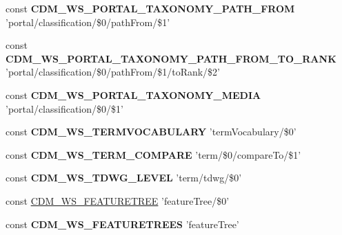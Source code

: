 \begin{DoxyCompactItemize}
\item 
\hypertarget{webservice__uris_8php_ab6da2426086817166528c03c7dc3fca9}{const {\bfseries C\-D\-M\-\_\-\-W\-S\-\_\-\-P\-O\-R\-T\-A\-L\-\_\-\-T\-A\-X\-O\-N\-O\-M\-Y\-\_\-\-P\-A\-T\-H\-\_\-\-F\-R\-O\-M} 'portal/classification/\$0/path\-From/\$1'}\label{webservice__uris_8php_ab6da2426086817166528c03c7dc3fca9}

\item 
\hypertarget{webservice__uris_8php_af16b56b68a9acae8e28b242070c035e2}{const {\bfseries C\-D\-M\-\_\-\-W\-S\-\_\-\-P\-O\-R\-T\-A\-L\-\_\-\-T\-A\-X\-O\-N\-O\-M\-Y\-\_\-\-P\-A\-T\-H\-\_\-\-F\-R\-O\-M\-\_\-\-T\-O\-\_\-\-R\-A\-N\-K} 'portal/classification/\$0/path\-From/\$1/to\-Rank/\$2'}\label{webservice__uris_8php_af16b56b68a9acae8e28b242070c035e2}

\item 
\hypertarget{webservice__uris_8php_aa2fa0dc46cbff87ad9052e1d9c3a3157}{const {\bfseries C\-D\-M\-\_\-\-W\-S\-\_\-\-P\-O\-R\-T\-A\-L\-\_\-\-T\-A\-X\-O\-N\-O\-M\-Y\-\_\-\-M\-E\-D\-I\-A} 'portal/classification/\$0/\$1'}\label{webservice__uris_8php_aa2fa0dc46cbff87ad9052e1d9c3a3157}

\item 
\hypertarget{webservice__uris_8php_a86e5dca53d3b090539b2ed9db2950ddf}{const {\bfseries C\-D\-M\-\_\-\-W\-S\-\_\-\-T\-E\-R\-M\-V\-O\-C\-A\-B\-U\-L\-A\-R\-Y} 'term\-Vocabulary/\$0'}\label{webservice__uris_8php_a86e5dca53d3b090539b2ed9db2950ddf}

\item 
\hypertarget{webservice__uris_8php_a0768fda96ea90460fafa4d43ff4fab57}{const {\bfseries C\-D\-M\-\_\-\-W\-S\-\_\-\-T\-E\-R\-M\-\_\-\-C\-O\-M\-P\-A\-R\-E} 'term/\$0/compare\-To/\$1'}\label{webservice__uris_8php_a0768fda96ea90460fafa4d43ff4fab57}

\item 
\hypertarget{webservice__uris_8php_a1935c65f19fcce217954a3e15b8491c8}{const {\bfseries C\-D\-M\-\_\-\-W\-S\-\_\-\-T\-D\-W\-G\-\_\-\-L\-E\-V\-E\-L} 'term/tdwg/\$0'}\label{webservice__uris_8php_a1935c65f19fcce217954a3e15b8491c8}

\item 
const \hyperlink{webservice__uris_8php_a05e8c8ebd2ef446a5a6e8304ee4d3bcb}{C\-D\-M\-\_\-\-W\-S\-\_\-\-F\-E\-A\-T\-U\-R\-E\-T\-R\-E\-E} 'feature\-Tree/\$0'
\item 
\hypertarget{webservice__uris_8php_a0c4139fa093d4d4ac34059886c65b1c2}{const {\bfseries C\-D\-M\-\_\-\-W\-S\-\_\-\-F\-E\-A\-T\-U\-R\-E\-T\-R\-E\-E\-S} 'feature\-Tree'}\label{webservice__uris_8php_a0c4139fa093d4d4ac34059886c65b1c2}


\end{DoxyCompactItemize}

